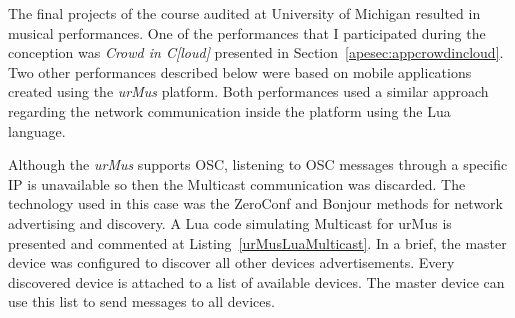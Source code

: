 The final projects of the course audited at University of Michigan resulted in musical performances.
One of the performances that I participated during the conception was \textit{Crowd in C[loud]} presented in Section~\ref{apesec:appcrowdincloud}.
Two other performances described below were based on mobile applications created using the \textit{urMus} platform.
Both performances used a similar approach regarding the network communication inside the platform using the Lua language.

Although the \textit{urMus} supports OSC, listening to OSC messages through a specific IP is unavailable so then the Multicast communication was discarded.
The technology used in this case was the ZeroConf and Bonjour methods for network advertising and discovery.
A Lua code simulating Multicast for urMus is presented and commented at Listing~\ref{urMusLuaMulticast}.
In a brief, the master device was configured to discover all other devices advertisements.
Every discovered device is attached to a list of available devices.
The master device can use this list to send messages to all devices.

